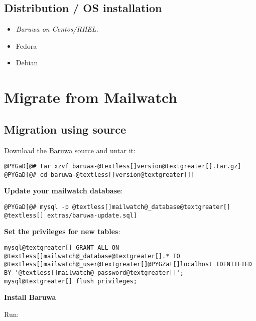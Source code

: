 \documentclass[a4paper,10pt,english]{manual}
\begin{document}
\section{Distribution / OS installation}
\begin{itemize}
\item {} 
\emph{Baruwa on Centos/RHEL}.

\item {} 
Fedora

\item {} 
Debian

\end{itemize}

\resetcurrentobjects
\hypertarget{--doc-migration}{}

\chapter{Migrate from Mailwatch}


\section{Migration using source}

Download the \href{http://www.topdog.za.net/baruwa\#downloads}{Baruwa} source
and untar it:

\begin{Verbatim}[commandchars=@\[\]]
@PYGaD[@# tar xzvf baruwa-@textless[]version@textgreater[].tar.gz]
@PYGaD[@# cd baruwa-@textless[]version@textgreater[]]
\end{Verbatim}

\textbf{Update your mailwatch database}:

\begin{Verbatim}[commandchars=@\[\]]
@PYGaD[@# mysql -p @textless[]mailwatch@_database@textgreater[] @textless[] extras/baruwa-update.sql]
\end{Verbatim}

\textbf{Set the privileges for new tables}:

\begin{Verbatim}[commandchars=@\[\]]
mysql@textgreater[] GRANT ALL ON @textless[]mailwatch@_database@textgreater[].* TO @textless[]mailwatch@_user@textgreater[]@PYGZat[]localhost IDENTIFIED BY '@textless[]mailwatch@_password@textgreater[]';
mysql@textgreater[] flush privileges;
\end{Verbatim}

\textbf{Install Baruwa}

Run:
\end{document}
